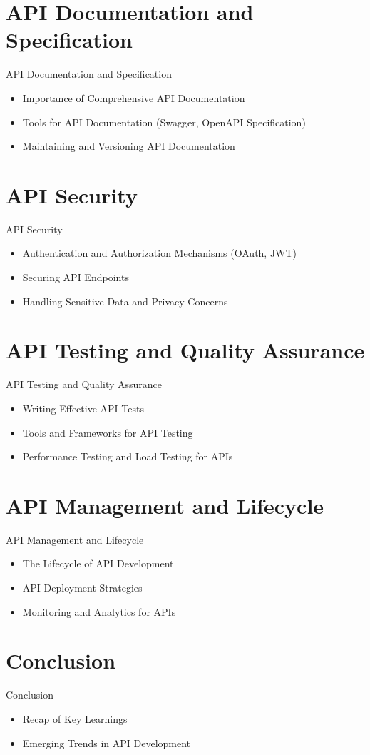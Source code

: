 \documentclass{beamer}
\begin{document}
\section{API Documentation and Specification}
\begin{frame}{API Documentation and Specification}
  \begin{itemize}
    \item Importance of Comprehensive API Documentation
    \item Tools for API Documentation (Swagger, OpenAPI Specification)
    \item Maintaining and Versioning API Documentation
  \end{itemize}
\end{frame}

\section{API Security}
\begin{frame}{API Security}
  \begin{itemize}
    \item Authentication and Authorization Mechanisms (OAuth, JWT)
    \item Securing API Endpoints
    \item Handling Sensitive Data and Privacy Concerns
  \end{itemize}
\end{frame}

\section{API Testing and Quality Assurance}
\begin{frame}{API Testing and Quality Assurance}
  \begin{itemize}
    \item Writing Effective API Tests
    \item Tools and Frameworks for API Testing
    \item Performance Testing and Load Testing for APIs
  \end{itemize}
\end{frame}


\section{API Management and Lifecycle}
\begin{frame}{API Management and Lifecycle}
  \begin{itemize}
    \item The Lifecycle of API Development
    \item API Deployment Strategies
    \item Monitoring and Analytics for APIs
  \end{itemize}
\end{frame}

\section{Conclusion}
\begin{frame}{Conclusion}
  \begin{itemize}
    \item Recap of Key Learnings
    \item Emerging Trends in API Development
  \end{itemize}
\end{frame}
\end{document}
